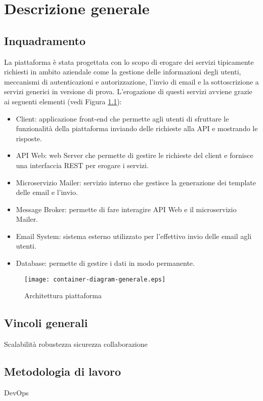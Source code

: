 \chapter{Descrizione generale}

\section{Inquadramento}
La piattaforma è stata progettata con lo scopo di erogare dei servizi tipicamente richiesti in ambito aziendale come la gestione delle
informazioni degli utenti, meccanismi di autenticazioni e autorizzazione, l'invio di
email e la sottoscrizione a servizi generici in versione di prova.
L'erogazione di questi servizi avviene grazie ai seguenti elementi (vedi Figura \ref{fig:Piattaforma}):
\begin{itemize}
    \itemsep0em
    \item Client: applicazione front-end che permette agli utenti di sfruttare le funzionalità della piattaforma inviando delle richieste alla API e mostrando le risposte.
    \item API Web: web Server che permette di gestire le richieste del client e fornisce una interfaccia REST per erogare i servizi.
    \item Microservizio Mailer: servizio interno che gestisce la generazione dei template delle email e l'invio.
    \item Message Broker: permette di fare interagire API Web e il microservizio Mailer.
    \item Email System: sistema esterno utilizzato per l'effettivo invio delle email agli utenti.
    \item Database: permette di gestire i dati in modo permanente.
\end{itemize}

\begin{figure}[H]
    \centering
    \texttt{[image: container-diagram-generale.eps]}
    \caption{Architettura piattaforma}
    \label{fig:Piattaforma}
\end{figure}
\newpage

\section{Vincoli generali}
Scalabilità
robustezza
sicurezza
collaborazione


\section{Metodologia di lavoro}
DevOps


